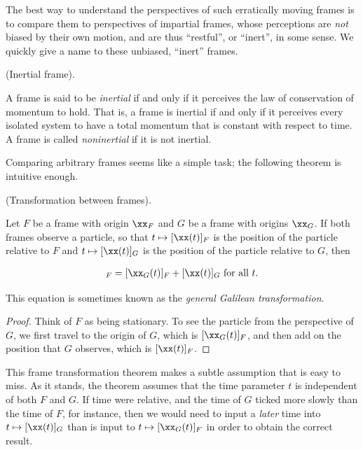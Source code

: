 \documentclass{article}
\begin{document}
The best way to understand the perspectives of such erratically moving frames is to compare them to perspectives of impartial frames, whose perceptions are \textit{not} biased by their own motion, and are thus ``restful'', or ``inert'', in some sense. We quickly give a name to these unbiased, ``inert'' frames.

\begin{defn}
	(Inertial frame).
	
	A frame is said to be \textit{inertial} if and only if it perceives the law of conservation of momentum to hold. That is, a frame is inertial if and only if it perceives every isolated system to have a total momentum that is constant with respect to time. A frame is called \textit{noninertial} if it is not inertial.
\end{defn}

Comparing arbitrary frames seems like a simple task; the following theorem is intuitive enough.

\begin{theorem}
	(Transformation between frames).
	
	Let $F$ be a frame with origin $\xx_F$ and $G$ be a frame with origins $\xx_G$. If both frames observe a particle, so that $t \mapsto [\xx(t)]_F$ is the position of the particle relative to $F$ and $t \mapsto [\xx(t)]_G$ is the position of the particle relative to $G$, then
	
	\begin{align*}
		[\xx(t)]_F = [\xx_G(t)]_F + [\xx(t)]_G \text{ for all $t$}.
	\end{align*}
	
	This equation is sometimes known as the \textit{general Galilean transformation}.
\end{theorem}

\begin{proof}
	Think of $F$ as being stationary. To see the particle from the perspective of $G$, we first travel to the origin of $G$, which is $[\xx_G(t)]_F$, and then add on the position that $G$ observes, which is $[\xx(t)]_F$.
\end{proof}

This frame transformation theorem makes a subtle assumption that is easy to miss. As it stands, the theorem assumes that the time parameter $t$ is independent of both $F$ and $G$. If time were relative, and the time of $G$ ticked more slowly than the time of $F$, for instance, then we would need to input a \textit{later} time into $t \mapsto [\xx(t)]_G$ than is input to $t \mapsto [\xx_G(t)]_F$ in order to obtain the correct result.
\end{document}
